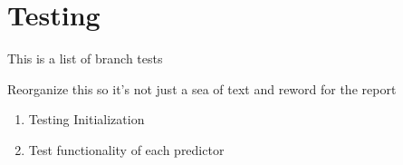 \documentclass[]{report}   %
\begin{document}
\chapter{Testing}
This is a list of branch tests

Reorganize this so it's not just a sea of text and reword for the report\cite{kessler}

\begin{enumerate}[I]
  \item{Testing Initialization}
  \item{Test functionality of each predictor}

\end{enumerate}
\end{document}
